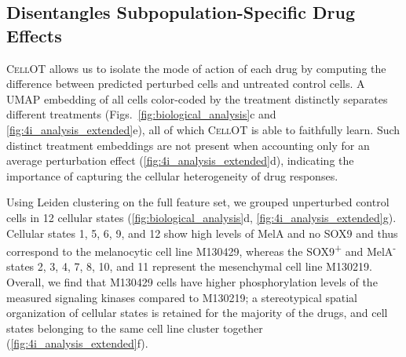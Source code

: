 \subsection{Disentangles Subpopulation-Specific Drug Effects}
\textsc{CellOT} allows us to 
isolate the mode of action of each drug by computing the difference between predicted perturbed cells and untreated control cells. %
A UMAP embedding of all cells color-coded by the treatment distinctly separates different treatments (Figs.~\ref{fig:biological_analysis}c and \ref{fig:4i_analysis_extended}e), all of which \textsc{CellOT} is able to faithfully learn.
Such distinct treatment embeddings are not present when accounting only for an average perturbation effect (\cref{fig:4i_analysis_extended}d), indicating the importance of capturing the cellular heterogeneity of drug responses.

 Using Leiden clustering on the full feature set, we grouped unperturbed control cells in 12 cellular states (\cref{fig:biological_analysis}d, \cref{fig:4i_analysis_extended}g). Cellular states 1, 5, 6, 9, and 12 show high levels of MelA and no SOX9 and thus correspond to the melanocytic cell line M130429, whereas the SOX9\textsuperscript{+} and MelA\textsuperscript{-} states 2, 3, 4, 7, 8, 10, and 11 represent the mesenchymal cell line M130219. Overall, we find that M130429 cells have higher phosphorylation levels of the measured signaling kinases compared to M130219;
a stereotypical spatial organization of cellular states is retained for the majority of the drugs,  and cell states belonging to the same cell line cluster together (\cref{fig:4i_analysis_extended}f). 

